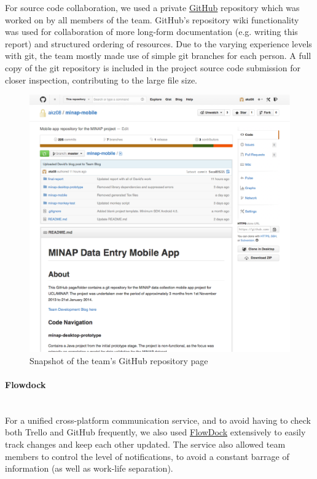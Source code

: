 \documentclass[12pt,a4paper,oneside,titlepage]{article}
\begin{document}
For source code collaboration, we used a private \href{https://github.com}{GitHub} repository which was worked on by all members of the team. GitHub's repository wiki functionality was used for collaboration of more long-form documentation (e.g. writing this report) and structured ordering of resources. Due to the varying experience levels with git, the team mostly made use of simple git branches for each person. A full copy of the git repository is included in the project source code submission for closer inspection, contributing to the large file size. 

\begin{figure}[h!]
\centering
\includegraphics[scale=0.3]{img/github.png}
\caption{Snapshot of the team's GitHub repository page}
\end{figure}
\paragraph{Flowdock} ~\\
For a unified cross-platform communication service, and to avoid having to check both Trello and GitHub frequently, we also used \href{https://www.flowdock.com/}{FlowDock} extensively to easily track changes and keep each other updated. The service also allowed team members to control the level of notifications, to avoid a constant barrage of information (as well as work-life separation).
\end{document}
